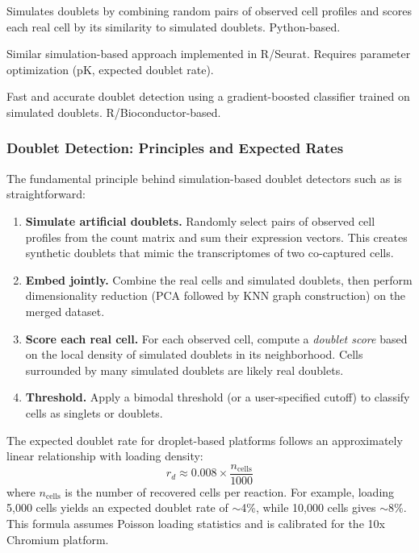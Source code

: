 \begin{description}[style=nextline]
  \item[\software{Scrublet}] Simulates doublets by combining random pairs of
    observed cell profiles and scores each real cell by its similarity to
    simulated doublets. Python-based.
  \item[\software{DoubletFinder}] Similar simulation-based approach implemented
    in R/Seurat. Requires parameter optimization (pK, expected doublet rate).
  \item[\software{scDblFinder}] Fast and accurate doublet detection using a
    gradient-boosted classifier trained on simulated doublets.
    R/Bioconductor-based.
\end{description}

\subsubsection{Doublet Detection: Principles and Expected Rates}
\label{subsec:scrnaseq:doublet_principles}

The fundamental principle behind simulation-based doublet detectors such as
 is straightforward:

\begin{enumerate}[nosep]
  \item \textbf{Simulate artificial doublets.} Randomly select pairs of observed
    cell profiles from the count matrix and sum their expression vectors. This
    creates synthetic doublets that mimic the transcriptomes of two co-captured
    cells.
  \item \textbf{Embed jointly.} Combine the real cells and simulated doublets,
    then perform dimensionality reduction (PCA followed by KNN graph
    construction) on the merged dataset.
  \item \textbf{Score each real cell.} For each observed cell, compute a
    \emph{doublet score} based on the local density of simulated doublets in
    its neighborhood. Cells surrounded by many simulated doublets are likely
    real doublets.
  \item \textbf{Threshold.} Apply a bimodal threshold (or a user-specified
    cutoff) to classify cells as singlets or doublets.
\end{enumerate}

The expected doublet rate for droplet-based platforms follows an approximately
linear relationship with loading density:
\begin{equation}
  \label{eq:scrnaseq:doubletrate}
  r_d \approx 0.008 \times \frac{n_{\text{cells}}}{1000}
\end{equation}
where $n_{\text{cells}}$ is the number of recovered cells per reaction. For
example, loading 5,000 cells yields an expected doublet rate of $\sim$4\%, while
10,000 cells gives $\sim$8\%. This formula assumes Poisson loading statistics
and is calibrated for the 10x Chromium platform.

